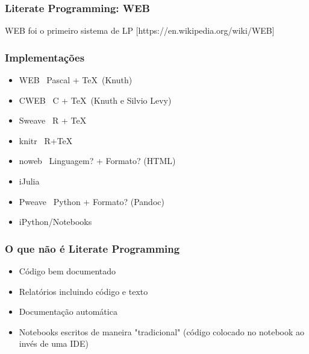 \documentclass[10pt]{beamer}
\begin{document}
\begin{frame}[fragile]
  \frametitle{Literate Programming: WEB}
  WEB foi o primeiro sistema de LP [https://en.wikipedia.org/wiki/WEB]
  \begin{center}
  \end{center}

  \begin{center}
    \href{https://github.com/zyedidia/Literate/blob/master/examples/wc.lit}{}
  \end{center}
\end{frame}

\begin{frame}
  \frametitle{Implementações}
  \begin{itemize}
  \item WEB \textemdash\ Pascal + \TeX\ (Knuth) 
  \item CWEB \textemdash\ C + \TeX\ (Knuth e Silvio Levy)
  \item Sweave \textemdash\ R + \TeX
  \item knitr \textemdash\ R+\TeX
  \item noweb \textemdash\ Linguagem? + Formato? (HTML)
  \item iJulia
  \item Pweave \textemdash\ Python + Formato? (Pandoc)
  \item \alert{iPython/Notebooks}
  \end{itemize}
\end{frame}

\begin{frame}
  \frametitle{O que não é Literate Programming}
  \begin{itemize}
  \item Código bem documentado
  \item Relatórios incluindo código e texto 
  \item Documentação automática
  \item Notebooks escritos de maneira "tradicional" (código colocado no notebook ao invés de uma IDE)
  \end{itemize}
\end{frame}
\end{document}
